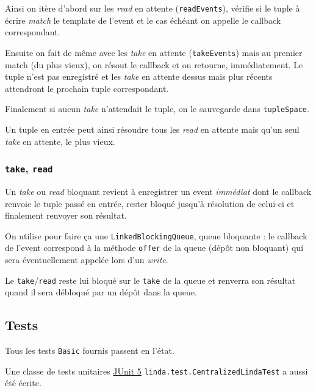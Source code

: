 \documentclass[headings=standardclasses,parskip=half]{scrartcl}
\begin{document}
Ainsi on itère d'abord sur les \emph{read} en attente (\texttt{readEvents}),
vérifie si le tuple à écrire \textit{match} le template de l'event et le cas
échéant on appelle le callback correspondant.

Ensuite on fait de même avec les \emph{take} en attente (\texttt{takeEvents})
mais au premier match (du plus vieux), on résout le callback et on retourne,
immédiatement. Le tuple n'est pas enregistré et les \emph{take} en attente
dessus mais plus récents attendront le prochain tuple correspondant.

Finalement si aucun \emph{take} n'attendait le tuple, on le sauvegarde dans
\texttt{tupleSpace}.

Un tuple en entrée peut ainsi résoudre tous les \emph{read} en attente mais
qu'un seul \emph{take} en attente, le plus vieux.

\subsubsection{\texttt{take}, \texttt{read}}

Un \emph{take} ou \emph{read} bloquant revient à enregistrer un event
\emph{immédiat} dont le callback renvoie le tuple passé en entrée,
rester bloqué jusqu'à résolution de celui-ci et finalement renvoyer
son résultat.

On utilise pour faire ça une \texttt{LinkedBlockingQueue}, queue bloquante :
le callback de l'event correspond à la méthode \texttt{offer} de la queue
(dépôt non bloquant) qui sera éventuellement appelée lors d'un \emph{write}.

Le \texttt{take}/\texttt{read} reste lui bloqué sur le \texttt{take} de la
queue et renverra son résultat quand il sera débloqué par un dépôt dans
la queue.

\subsection{Tests}

Tous les tests \texttt{Basic} fournis passent en l'état.

Une classe de tests unitaires \href{https://junit.org/junit5/}{JUnit 5}
\texttt{linda.test.CentralizedLindaTest} a aussi été écrite.
\end{document}
